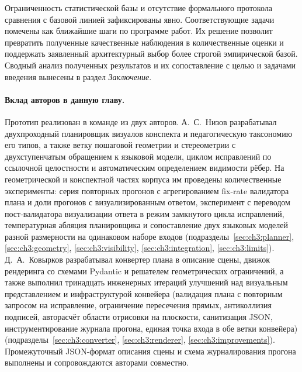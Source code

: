Ограниченность статистической базы и отсутствие формального протокола сравнения с базовой линией зафиксированы явно. Соответствующие задачи помечены как ближайшие шаги по программе работ. Их решение позволит превратить полученные качественные наблюдения в количественные оценки и поддержать заявленный архитектурный выбор более строгой эмпирической базой. Сводный анализ полученных результатов и их сопоставление с целью и задачами введения вынесены в раздел \emph{Заключение}.

\paragraph{Вклад авторов в данную главу.} Прототип реализован в команде из двух авторов. А.~С.~Низов разрабатывал двухпроходный планировщик визуалов конспекта и педагогическую таксономию его типов, а также ветку пошаговой геометрии и стереометрии с двухступенчатым обращением к языковой модели, циклом исправлений по ссылочной целостности и автоматическим определением видимости рёбер. На геометрической и конспектной частях корпуса им проведены количественные эксперименты: серия повторных прогонов с агрегированием fix\nobreakdash-rate валидатора плана и доли прогонов с визуализированным ответом, эксперимент с переводом пост\nobreakdash-валидатора визуализации ответа в режим замкнутого цикла исправлений, температурная абляция планировщика и сопоставление двух языковых моделей разной размерности на одинаковом наборе входов (подразделы~\ref{sec:ch3:planner}, \ref{sec:ch3:geometry}, \ref{sec:ch3:visibility}, \ref{sec:ch3:integration}, \ref{sec:ch3:limits}). Д.~А.~Ковырков разрабатывал конвертер плана в описание сцены, движок рендеринга со схемами Pydantic и решателем геометрических ограничений, а также выполнил тринадцать инженерных итераций улучшений над визуальным представлением и инфраструктурой конвейера (валидация плана с повторным запросом на исправление, ограничение пересечения прямых, антиколлизия подписей, авторасчёт области отрисовки на плоскости, санитизация JSON, инструментирование журнала прогона, единая точка входа в обе ветки конвейера) (подразделы~\ref{sec:ch3:converter}, \ref{sec:ch3:renderer}, \ref{sec:ch3:improvements}). Промежуточный JSON\nobreakdash-формат описания сцены и схема журналирования прогона выполнены и сопровождаются авторами совместно.
